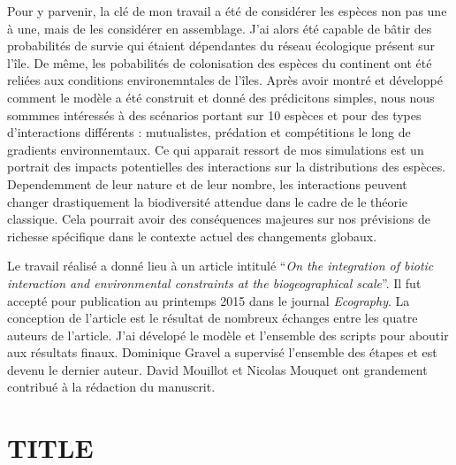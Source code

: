 Pour y parvenir, la clé de mon travail a été de considérer les espèces non pas une à une, mais de les considérer en assemblage. J'ai alors été capable de bâtir des probabilités de survie qui étaient dépendantes du réseau écologique présent sur l'île. De même, les pobabilités de colonisation des espèces du continent ont été reliées aux conditions environemntales de l'îles. Après avoir montré et développé comment le modèle a été construit et donné des prédicitons simples, nous nous sommmes intéressés à des scénarios portant sur 10 espèces et pour des types d'interactions différents : mutualistes, prédation et compétitions le long de  gradients environnemtaux. Ce qui apparait ressort de mos simulations est un portrait des impacts potentielles des interactions sur la distributions des espèces. Dependemment de leur nature et de leur nombre, les interactions peuvent changer drastiquement la biodiversité attendue dans le cadre de le théorie classique. Cela pourrait avoir des conséquences majeures sur nos prévisions de richesse spécifique dans le contexte actuel des changements globaux.

Le travail réalisé a donné lieu à un article intitulé \enquote{\textit{On the integration of biotic interaction and environmental constraints at the biogeographical scale}}. Il fut accepté pour publication au printemps 2015 dans le journal \textit{Ecography}.
La conception de l'article est le résultat de nombreux échanges entre les quatre auteurs de l'article. J'ai dévelopé le modèle et l'ensemble des scripts pour aboutir aux résultats finaux. Dominique Gravel a supervisé l'ensemble des étapes et est devenu le dernier auteur. David Mouillot et Nicolas Mouquet ont grandement contribué à la rédaction du manuscrit.


%

\newpage

\section{TITLE}

